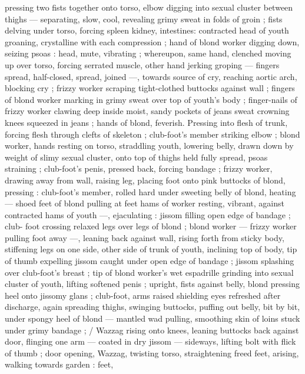 pressing two fists together onto torso, elbow digging into sexual 
cluster between thighs --- separating, slow, cool, revealing grimy 
sweat in folds of groin ; fists delving under torso, forcing spleen 
kidney, intestines: contracted head of youth groaning, crystalline 
with each compression ; hand of blond worker digging down, seizing 
psoas : head, mute, vibrating ; whereupon, same hand, clenched 
moving up over torso, forcing serrated muscle, other hand jerking 
groping --- fingers spread, half-closed, spread, joined ---, towards 
source of cry, reaching aortic arch, blocking cry ; frizzy worker 
scraping tight-clothed buttocks against wall ; fingers of blond worker 
marking in grimy sweat over top of youth's body ; finger-nails of 
frizzy worker clawing deep inside moist, sandy pockets of jeans 
sweat crowning knees squeezed in jeans ; hands of blond, feverish. 
Pressing into flesh of trunk, forcing flesh through clefts of skeleton 
; club-foot's member striking elbow ; blond worker, hands resting on 
torso, straddling youth, lowering belly, drawn down by weight of 
slimy sexual cluster, onto top of thighs held fully spread, psoas 
straining ; club-foot's penis, pressed back, forcing bandage ; frizzy 
worker, drawing away from wall, raising leg, placing foot onto pink 
buttocks of blond, pressing : club-foot's member, rolled hard under 
sweeting belly of blond, heating --- shoed feet of blond pulling at 
feet hams of worker resting, vibrant, against contracted hams of 
youth ---, ejaculating : jissom filling open edge of bandage ; club- 
foot crossing relaxed legs over legs of blond ; blond worker --- frizzy 
worker pulling foot away ---, leaning back against wall, rising forth 
from sticky body, stiffening legs on one side, other side of trunk of 
youth, inclining top of body, tip of thumb expelling jissom caught 
under open edge of bandage ; jissom splashing over club-foot's 
breast ; tip of blond worker's wet espadrille grinding into sexual 
cluster of youth, lifting softened penis ; upright, fists against belly, 
blond pressing heel onto jissomy glans ; club-foot, arms raised 
shielding eyes refreshed after discharge, again spreading thighs, 
swinging buttocks, puffing out belly, bit by bit, under spongy heel of 
blond --- mantled wad pulling, smoothing skin of loins stuck under 
grimy bandage ; {\slash} Wazzag rising onto knees, leaning buttocks back 
against door, flinging one arm --- coated in dry jissom --- sideways, 
lifting bolt with flick of thumb ; door opening, Wazzag, twisting torso, 
straightening freed feet, arising, walking towards garden : feet, 
